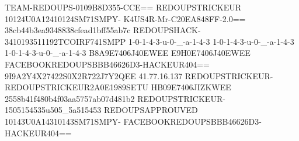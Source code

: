 TEAM-REDOUPS-0109B8D355-CCE==
REDOUPSTRICKEUR 10124U0A12410124SM71SMPY-
K4US4R-Mr-C20EA848FF-2.0==
38cb44b3ea9348838cfead1bff55ab7c
REDOUPSHACK-3410193511192TCOIRF741SMPP
1-0-1-4-3-u-0-_-a-1-4-3
1-0-1-4-3-u-0-_-a-1-4-3
1-0-1-4-3-u-0-_-a-1-4-3
B8A9E7406J40EWEE
E9H0E7406J40EWEE
FACEBOOKREDOUPSBBB46626D3-HACKEUR404==
9I9A2Y4X27422S0X2R722J7Y2QEE
41.77.16.137
REDOUPSTRICKEUR-REDOUPSTRICKEUR2A0E1989SETU
HB09E7406JIZKWEE
2558b41f480b4f03aa5757ab07d481b2
REDOUPSTRICKEUR-1505154535u505_5a515453
REDOUPSAPPROUVED 10143U0A14310143SM71SMPY-
FACEBOOKREDOUPSBBB46626D3-HACKEUR404==
